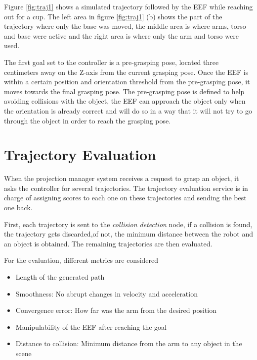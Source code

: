 Figure \ref{fig:traj1} shows a simulated trajectory followed by the EEF while reaching out for a cup. The left area in figure \ref{fig:traj1} (b) shows the part of the trajectory where only the base was moved, the middle area is where arms, torso and base were active and the right area is where only the arm and torso were used.

The first goal set to the controller is a pre-grasping pose, located three centimeters away on the Z-axis from the current grasping pose. Once the EEF is within a certain position and orientation threshold from the  pre-grasping pose, it moves towards the final grasping pose. The pre-grasping pose is defined to help avoiding collisions with the object, the EEF can approach the object only when the orientation is already correct and will do so in a way that it will not try to go through the object in order to reach the grasping pose.



\section{Trajectory Evaluation}
\label{sec:traj_eval}

When the projection manager system receives a request to grasp an object, it asks the controller for several trajectories. The trajectory evaluation service is in charge of assigning scores to each one on these trajectories and sending the best one back.

First, each trajectory is sent to the \textit{collision detection} node, if a collision is found, the trajectory gets discarded,of not, the minimum distance between the robot and an object is obtained. The remaining trajectories are then evaluated.

For the evaluation, different metrics are considered
\begin{itemize}
	\item Length of the generated path
	\item Smoothness: No abrupt changes in velocity and acceleration
	\item Convergence error: How far was the arm from the desired position
	\item Manipulability of the EEF after reaching the goal
	\item Distance to collision: Minimum distance from the arm to any object in the scene
\end{itemize}

